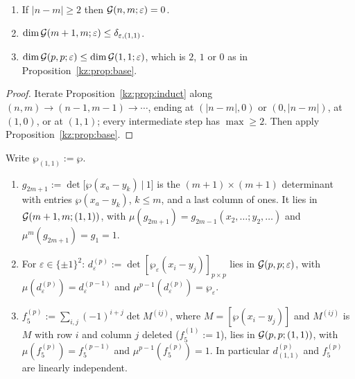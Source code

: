 \begin{corollary}\label{kz:cor:bounds}
\begin{enumerate}
\item[(a)] If $|n-m|\ge2$ then $\mathcal{G}(n,m;\varepsilon)=0$.
\item[(b)] $\dim\mathcal{G}(m+1,m;\varepsilon)\le\delta_{\varepsilon,(1,1)}$.
\item[(c)] $\dim\mathcal{G}(p,p;\varepsilon)\le\dim\mathcal{G}(1,1;\varepsilon)$, which is $2$, $1$ or $0$ as in
Proposition~\ref{kz:prop:base}.
\end{enumerate}
\end{corollary}

\begin{proof}
Iterate Proposition~\ref{kz:prop:induct} along $(n,m)\to(n-1,m-1)\to\cdots$, ending at $(|n-m|,0)$ or $(0,|n-m|)$,
at $(1,0)$, or at $(1,1)$; every intermediate step has $\max\ge2$. Then apply Proposition~\ref{kz:prop:base}.
\end{proof}

\begin{proposition}\label{kz:prop:explicit}
Write $\wp_{(1,1)}:=\wp$.
\begin{enumerate}
\item[(a)] $g_{2m+1}:=\det\big[\wp(x_a-y_k)\ \big|\ 1\big]$ is the $(m+1)\times(m+1)$ determinant with entries
$\wp(x_a-y_k)$, $k\le m$, and a last column of ones. It lies in $\mathcal{G}(m+1,m;(1,1))$, with
$\mu(g_{2m+1})=g_{2m-1}(x_2,\dots;y_2,\dots)$ and $\mu^m(g_{2m+1})=g_1=1$.
\item[(b)] For $\varepsilon\in\{\pm1\}^2$: $d^{(p)}_\varepsilon:=\det[\wp_\varepsilon(x_i-y_j)]_{p\times p}$ lies in $\mathcal{G}(p,p;\varepsilon)$, with
$\mu(d^{(p)}_\varepsilon)=d^{(p-1)}_\varepsilon$ and $\mu^{p-1}(d^{(p)}_\varepsilon)=\wp_\varepsilon$.
\item[(c)] $f_5^{(p)}:=\sum_{i,j}(-1)^{i+j}\det M^{(ij)}$, where $M=[\wp(x_i-y_j)]$ and $M^{(ij)}$ is $M$ with
row $i$ and column $j$ deleted ($f_5^{(1)}:=1$), lies in $\mathcal{G}(p,p;(1,1))$, with $\mu(f_5^{(p)})=f_5^{(p-1)}$ and
$\mu^{p-1}(f_5^{(p)})=1$. In particular $d^{(p)}_{(1,1)}$ and $f_5^{(p)}$ are linearly independent.
\end{enumerate}
\end{proposition}


